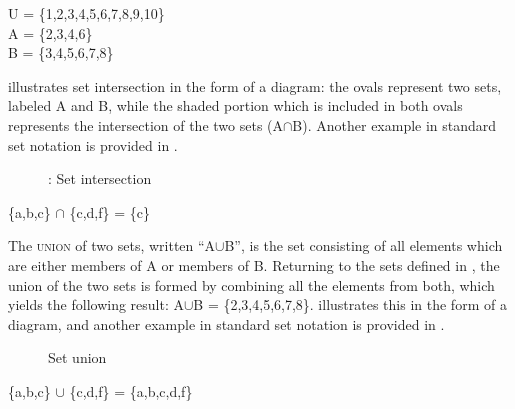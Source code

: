 \ea \label{ex:13.14}
U = \{1,2,3,4,5,6,7,8,9,10\}\\
A = \{2,3,4,6\}\\
B = \{3,4,5,6,7,8\}
\z


 illustrates set intersection in the form of a diagram: the ovals represent two sets, labeled A and B, while the shaded portion which is included in both ovals represents the intersection of the two sets (A${\cap}$B). Another example in standard set notation is provided in .

\begin{figure}
 


\caption{\label{fig:13:2}: Set intersection}
\end{figure}

\ea \label{ex:13.15}
\{a,b,c\} ${\cap}$ \{c,d,f\} = \{c\}
\z


The \textsc{union} of two sets, written “A${\cup}$B”, is the set consisting of all elements which are either members of A or members of B. Returning to the sets defined in , the union of the two sets is formed by combining all the elements from both, which yields the following result: A${\cup}$B = \{2,3,4,5,6,7,8\}.  illustrates this in the form of a diagram, and another example in standard set notation is provided in .


\begin{figure}

\caption{\label{fig:13:3}Set union}
\end{figure}

\ea \label{ex:13.16}
\{a,b,c\} ${\cup}$ \{c,d,f\} = \{a,b,c,d,f\}
\z


